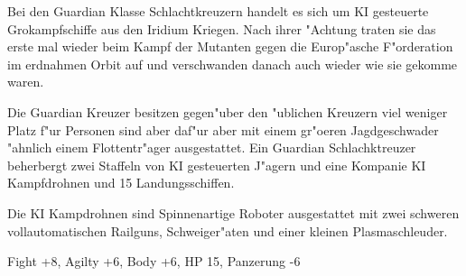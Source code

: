 Bei den Guardian Klasse Schlachtkreuzern handelt es sich um KI gesteuerte Gro\3kampfschiffe aus den Iridium Kriegen. Nach ihrer "Achtung traten sie das erste mal wieder beim Kampf der Mutanten gegen die Europ"asche F"orderation im erdnahmen Orbit auf und verschwanden danach auch wieder wie sie gekomme waren.

Die Guardian Kreuzer besitzen gegen"uber den "ublichen Kreuzern viel weniger Platz f"ur Personen sind aber daf"ur aber mit einem gr"o\3eren Jagdgeschwader "ahnlich einem Flottentr"ager ausgestattet. Ein Guardian Schlachktreuzer beherbergt zwei Staffeln von KI gesteuerten J"agern und eine Kompanie KI Kampfdrohnen und 15 Landungsschiffen.

Die KI Kampdrohnen sind Spinnenartige Roboter ausgestattet mit zwei schweren vollautomatischen Railguns, Schwei\3ger"aten und einer kleinen Plasmaschleuder.

Fight +8, Agilty +6, Body +6, HP 15, Panzerung -6


